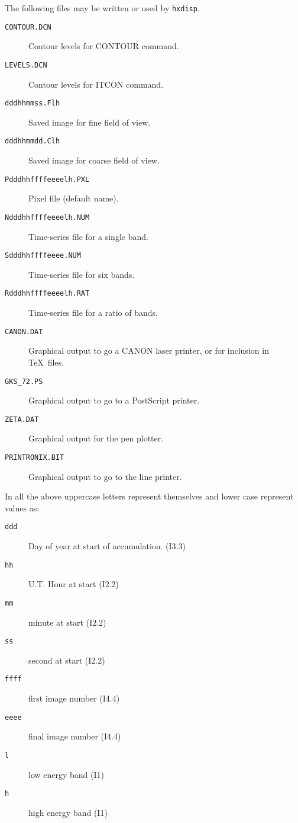 The following files may be written or used by \verb!hxdisp!.
\begin{description}
\item[\tt CONTOUR.DCN] Contour levels for CONTOUR command.
\item[\tt LEVELS.DCN] Contour levels for ITCON command.
\item[\tt dddhhmmss.Flh] Saved image for fine field of view.
\item[\tt dddhhmmdd.Clh] Saved image for coarse field of view.
\item[\tt Pdddhhffffeeeelh.PXL] Pixel file (default name).
\item[\tt Ndddhhffffeeeelh.NUM] Time-series file for a single band.
\item[\tt Sdddhhffffeeee.NUM] Time-series file for six bands.
\item[\tt Rdddhhffffeeeelh.RAT] Time-series file for a ratio of bands.
\item[\tt CANON.DAT] Graphical output to go a CANON laser printer, or
for inclusion in \TeX\ files.
\item[\tt GKS\_72.PS] Graphical output to go to a PostScript printer.
\item[\tt ZETA.DAT] Graphical output for the pen plotter.
\item[\tt PRINTRONIX.BIT] Graphical output to go to the line printer.
\end{description}
In all the above uppercase letters represent themselves and lower case
represent values as:
\begin{description}
\item[\tt ddd] Day of year at start of accumulation. (I3.3)
\item[\tt hh] U.T. Hour at start (I2.2)
\item[\tt mm] minute at start (I2.2)
\item[\tt ss] second at start (I2.2)
\item[\tt ffff] first image number (I4.4)
\item[\tt eeee] final image number (I4.4)
\item[\tt l] low energy band (I1)
\item[\tt h] high energy band (I1)
\end{description}


